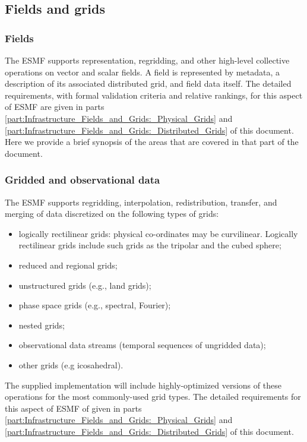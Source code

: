 \subsection{Fields and grids}

\subsubsection{Fields}
The ESMF supports representation, regridding, and other high-level
collective operations on vector and scalar fields.  A field is represented 
by metadata, a description of its associated distributed grid, and field 
data itself.
The detailed requirements, with formal validation criteria
and relative rankings, for this aspect of ESMF are given
in parts \ref{part:Infrastructure_Fields_and_Grids:_Physical_Grids} and \ref{part:Infrastructure_Fields_and_Grids:_Distributed_Grids} of this document.
Here we provide a brief synopsis of the areas that are covered
in that part of the document.

\subsubsection{Gridded and observational data}

The ESMF supports regridding, interpolation, redistribution,
transfer, and merging of data discretized on the following types of grids:

\begin{itemize}
\item logically rectilinear grids: physical co-ordinates may be
  curvilinear. Logically rectilinear grids include such grids as the
  tripolar and the cubed sphere;
\item reduced and regional grids;
\item unstructured grids (e.g., land grids);
\item phase space grids (e.g., spectral, Fourier);
\item nested grids;
\item observational data streams (temporal sequences of ungridded data);
\item other grids (e.g icosahedral).
\end{itemize}

The supplied implementation will include highly-optimized versions of
these operations for the most commonly-used grid types. The detailed 
requirements for this aspect of ESMF of given in parts \ref{part:Infrastructure_Fields_and_Grids:_Physical_Grids} and \ref{part:Infrastructure_Fields_and_Grids:_Distributed_Grids} of this document.

